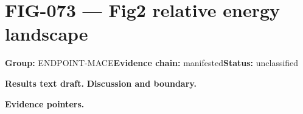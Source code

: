 \clearpage
\section{FIG-073 --- Fig2 relative energy landscape}
\label{figpage:fig-073}
\textbf{Group:} ENDPOINT-MACE\quad \textbf{Evidence chain:} manifested\quad \textbf{Status:} unclassified

\textbf{Results text draft.} 
\textbf{Discussion and boundary.} 


\textbf{Evidence pointers.}



\vfill
